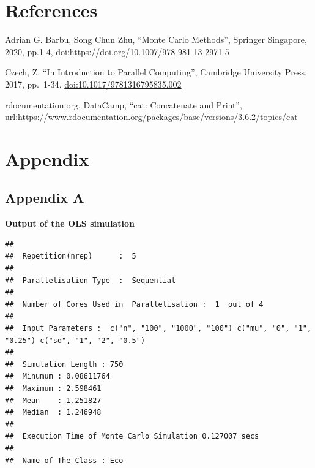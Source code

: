 \documentclass[11pt,a4paper]{article}
\begin{document}
\pagebreak

\hypertarget{references}{%
\section{References}\label{references}}

Adrian G. Barbu, Song Chun Zhu, ``Monte Carlo Methods'', Springer
Singapore, 2020, pp.1-4,
\url{doi:https://doi.org/10.1007/978-981-13-2971-5}

Czech, Z. ``In Introduction to Parallel Computing'', Cambridge
University Press, 2017, pp.~1-34, \url{doi:10.1017/9781316795835.002}

rdocumentation.org, DataCamp, ``cat: Concatenate and Print'',
url:\url{https://www.rdocumentation.org/packages/base/versions/3.6.2/topics/cat}

\pagebreak

\hypertarget{appendix}{%
\section{Appendix}\label{appendix}}

\hypertarget{appendix-a}{%
\subsection{Appendix A}\label{appendix-a}}

\textbf{Output of the OLS simulation}

\begin{verbatim}
## 
##  Repetition(nrep)      :  5 
## 
##  Parallelisation Type  :  Sequential 
## 
##  Number of Cores Used in  Parallelisation :  1  out of 4 
## 
##  Input Parameters :  c("n", "100", "1000", "100") c("mu", "0", "1", "0.25") c("sd", "1", "2", "0.5") 
## 
##  Simulation Length : 750 
##  Minumum : 0.08611764 
##  Maximum : 2.598461 
##  Mean    : 1.251827 
##  Median  : 1.246948 
## 
##  Execution Time of Monte Carlo Simulation 0.127007 secs 
## 
##  Name of The Class : Eco
\end{verbatim}
\end{document}

